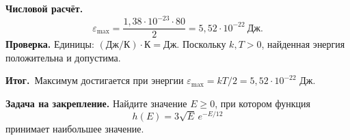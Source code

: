 \documentclass[a4paper,12pt]{article}
\newcommand{\resultlabel}{\textcolor{accent}{\textbf{Итог.}}}
\begin{document}
\textbf{Числовой расчёт.}
\[
 \varepsilon_{\max}=\frac{1{,}38\cdot10^{-23}\cdot80}{2}
 =\boxed{5{,}52\cdot10^{-22}\ \text{Дж}}.
\]
\textbf{Проверка.} Единицы: $(\text{Дж/К})\cdot\text{К}=\text{Дж}$. Поскольку $k,T>0$, найденная энергия положительна и допустима.

\resultlabel\ Максимум достигается при энергии $\varepsilon_{\max}=kT/2=5{,}52\cdot10^{-22}$ Дж.

\textbf{Задача на закрепление.} Найдите значение $E\ge0$, при котором функция
\[
 h(E)=3\sqrt{E}\,e^{-E/12}
\]
принимает наибольшее значение.
\end{document}
